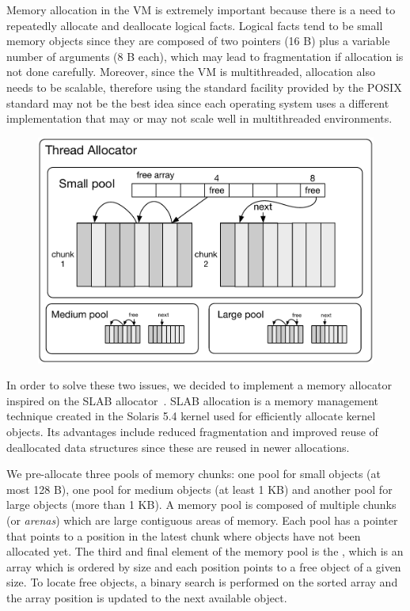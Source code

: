 
Memory allocation in the VM is extremely important because there is a need to
repeatedly allocate and deallocate logical facts. Logical facts tend to be small
memory objects since they are composed of two pointers (16 B) plus a variable
number of arguments (8 B each), which may lead to fragmentation if allocation is
not done carefully.  Moreover, since the VM is multithreaded, allocation also
needs to be scalable, therefore using the standard  facility
provided by the POSIX standard may not be the best idea since each operating
system uses a different implementation that may or may not scale well in
multithreaded environments.

\begin{figure}[ht]
   \begin{center}
      \includegraphics[width=0.7\linewidth]{figures/implementation/pool.pdf}
   \end{center}


   \label{fig:implementation:pool}
\end{figure}

In order to solve these two issues, we decided to implement a memory allocator
inspired on the SLAB allocator~\cite{Bonwick-94}. SLAB allocation is a memory
management technique created in the Solaris 5.4 kernel used for efficiently
allocate kernel objects. Its advantages include reduced fragmentation and
improved reuse of deallocated data structures since these are reused in newer
allocations.

We pre-allocate three pools of memory chunks: one pool for small objects (at
most 128 B), one pool for medium objects (at least 1 KB) and another pool for
large objects (more than 1 KB).  A memory pool is composed of multiple chunks
(or \emph{arenas}) which are large contiguous areas of memory. Each pool has a
 pointer that points to a position in the latest chunk where objects
have not been allocated yet. The third and final element of the memory pool is
the , which is an array which is ordered by size and each
position points to a free object of a given size. To locate free objects, a
binary search is performed on the sorted array and the array position is updated
to the next available object.

